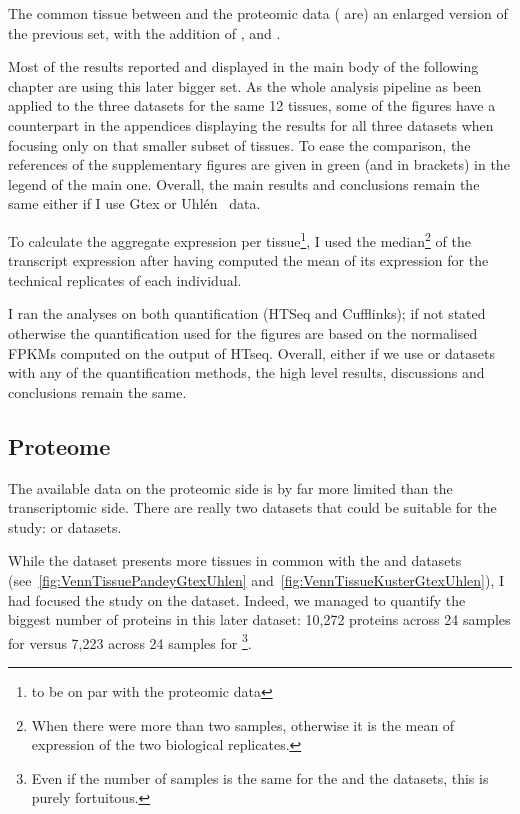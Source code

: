 The common tissue between  and the proteomic data
( are)
an enlarged version of the previous set, with the addition of ,  and .

Most of the results reported and displayed in the main body
of the following chapter are using this later bigger set. As the whole analysis
pipeline as been applied to the three datasets
for the same 12 tissues, some of the figures have a counterpart in the
appendices displaying the results for all three datasets when focusing only on
that smaller subset of tissues. To ease the comparison, the references of the
supplementary figures are given in green (and in brackets) in the legend of the
main one. Overall, the main results and conclusions remain the same either if
I use Gtex or Uhlén \etal\ data.

To calculate the aggregate expression per tissue\footnote{to be on par with the
proteomic data}, I used the median\footnote{When there were more than
two samples, otherwise it is the mean of expression of the two biological
replicates.} of the transcript expression after having computed the mean of its
expression for the technical replicates of each individual.

I ran the analyses on both quantification (HTSeq and Cufflinks); if not stated
otherwise the quantification used for the figures are based on the normalised
\glspl{FPKM} computed on the output of HTseq.
Overall, either if we use  or
 datasets with any of the quantification methods, the high level
results, discussions and conclusions remain the same.

\subsection{Proteome}
The available data on the proteomic side is by far more limited than the
transcriptomic side. There are really two datasets that could be suitable for
the study:  or  datasets.

While the  dataset presents more tissues in common
with the  and  datasets
(see~\cref{fig:VennTissuePandeyGtexUhlen}
and~\cref{fig:VennTissueKusterGtexUhlen}), I had focused the study on
the  dataset. Indeed, we managed to quantify the biggest
number of proteins in this later dataset: 10,272 proteins across 24 samples for
 versus 7,223 across 24 samples for \footnote{Even
if the number of samples is the same for the  and
the  datasets, this is purely fortuitous.}.

